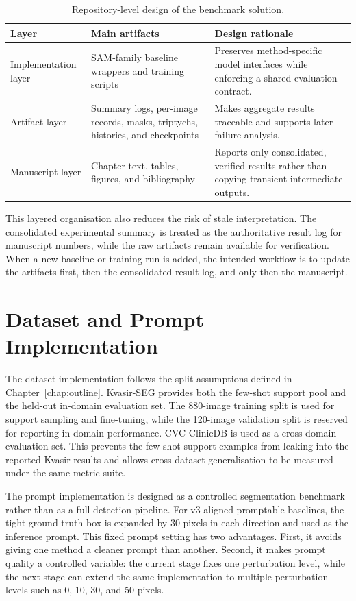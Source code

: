\begin{table}[H]
\centering
\caption{Repository-level design of the benchmark solution.}
\label{tab:repo-implementation-areas}
\begin{tabular}{p{3.1cm}p{5.0cm}p{5.2cm}}
\toprule
\textbf{Layer} & \textbf{Main artifacts} & \textbf{Design rationale} \\
\midrule
Implementation layer & SAM-family baseline wrappers and training scripts & Preserves method-specific model interfaces while enforcing a shared evaluation contract. \\
Artifact layer & Summary logs, per-image records, masks, triptychs, histories, and checkpoints & Makes aggregate results traceable and supports later failure analysis. \\
Manuscript layer & Chapter text, tables, figures, and bibliography & Reports only consolidated, verified results rather than copying transient intermediate outputs. \\
\bottomrule
\end{tabular}
\end{table}

This layered organisation also reduces the risk of stale interpretation. The consolidated experimental summary is treated as the authoritative result log for manuscript numbers, while the raw artifacts remain available for verification. When a new baseline or training run is added, the intended workflow is to update the artifacts first, then the consolidated result log, and only then the manuscript.

\section{Dataset and Prompt Implementation}
\label{sec:dataset-prompt-implementation}

The dataset implementation follows the split assumptions defined in Chapter~\ref{chap:outline}. Kvasir-SEG provides both the few-shot support pool and the held-out in-domain evaluation set. The 880-image training split is used for support sampling and fine-tuning, while the 120-image validation split is reserved for reporting in-domain performance. CVC-ClinicDB is used as a cross-domain evaluation set. This prevents the few-shot support examples from leaking into the reported Kvasir results and allows cross-dataset generalisation to be measured under the same metric suite.

The prompt implementation is designed as a controlled segmentation benchmark rather than as a full detection pipeline. For v3-aligned promptable baselines, the tight ground-truth box is expanded by 30 pixels in each direction and used as the inference prompt. This fixed prompt setting has two advantages. First, it avoids giving one method a cleaner prompt than another. Second, it makes prompt quality a controlled variable: the current stage fixes one perturbation level, while the next stage can extend the same implementation to multiple perturbation levels such as 0, 10, 30, and 50 pixels.

